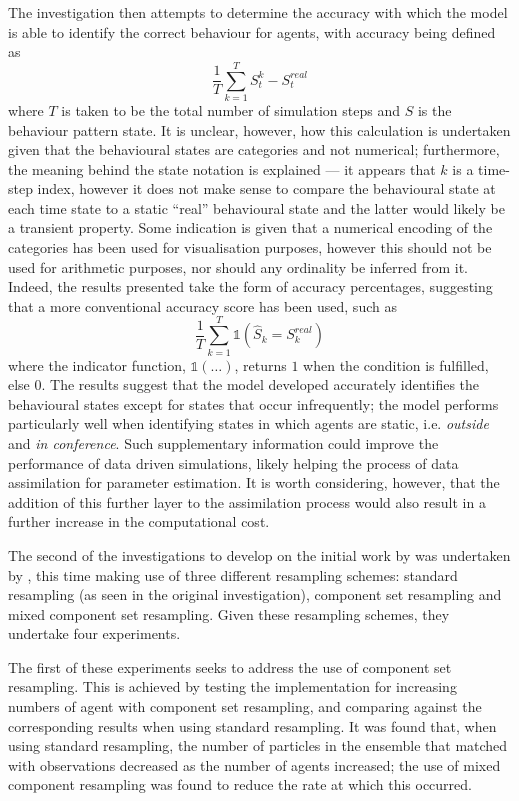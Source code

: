 The investigation then attempts to determine the accuracy with which the model
is able to identify the correct behaviour for agents, with accuracy being
defined as
\begin{equation}
    \frac{1}{T} \sum_{k=1}^T S_{t}^{k} - S_{t}^{real}
\end{equation}
where $T$ is taken to be the total number of simulation steps and $S$ is the
behaviour pattern state.
It is unclear, however, how this calculation is undertaken given that the
behavioural states are categories and not numerical; furthermore, the meaning
behind the state notation is explained --- it appears that $k$ is a time-step
index, however it does not make sense to compare the behavioural state at each
time state to a static ``real'' behavioural state and the latter would likely be
a transient property.
Some indication is given that a numerical encoding of the categories has been
used for visualisation purposes, however this should not be used for arithmetic
purposes, nor should any ordinality be inferred from it.
Indeed, the results presented take the form of accuracy percentages, suggesting
that a more conventional accuracy score has been used, such as
\begin{equation}
    \frac{1}{T} \sum_{k=1}^{T} \mathds{1} \left(
                \hat{S}_k = S_{k}^{real} \right)
\end{equation}
where the indicator function, $\mathds{1} \left( \ldots \right)$, returns $1$
when the condition is fulfilled, else $0$.
The results suggest that the model developed accurately identifies the
behavioural states except for states that occur infrequently; the model performs
particularly well when identifying states in which agents are static, i.e.
\textit{outside} and \textit{in conference}.
Such supplementary information could improve the performance of data driven
simulations, likely helping the process of data assimilation for parameter
estimation.
It is worth considering, however, that the addition of this further layer to the
assimilation process would also result in a further increase in the
computational cost.

The second of the investigations to develop on the initial work by
\citet{wang2013data} was undertaken by \citet{wang2015data}, this time making
use of three different resampling schemes: standard resampling (as seen in the
original investigation), component set resampling and mixed component set
resampling.
Given these resampling schemes, they undertake four experiments.

The first of these experiments seeks to address the use of component set
resampling.
This is achieved by testing the implementation for increasing numbers of agent
with component set resampling, and comparing against the corresponding results
when using standard resampling.
It was found that, when using standard resampling, the number of particles in
the ensemble that matched with observations decreased as the number of agents
increased; the use of mixed component resampling was found to reduce the rate at
which this occurred.

